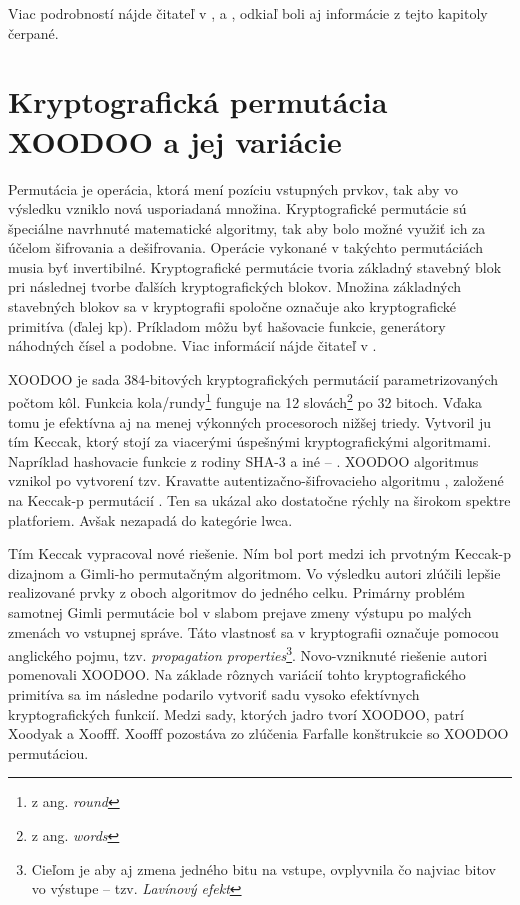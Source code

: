 Viac podrobností nájde čitateľ v \cite{lwc}, \cite{lwc2} a \cite{lwc3}, odkiaľ boli aj informácie z tejto kapitoly čerpané. 
        
\section{Kryptografická permutácia XOODOO a jej variácie}
Permutácia je operácia, ktorá mení pozíciu vstupných prvkov, tak aby vo výsledku vzniklo nová usporiadaná množina. Kryptografické permutácie sú špeciálne navrhnuté matematické algoritmy, tak aby bolo možné využiť ich za účelom šifrovania a dešifrovania. Operácie vykonané v takýchto permutáciách musia byť invertibilné. Kryptografické permutácie tvoria základný stavebný blok pri následnej tvorbe ďalších kryptografických blokov. Množina základných stavebných blokov sa v kryptografii spoločne označuje ako kryptografické primitíva (ďalej \acrshort{kp}). Príkladom môžu byť hašovacie funkcie, generátory náhodných čísel a podobne. Viac informácií nájde čitateľ v \cite{kp}.  
 
XOODOO je sada 384-bitových kryptografických permutácií parametrizovaných počtom kôl. Funkcia kola/rundy\footnote{z ang. \textit{round}} funguje na 12 slovách\footnote{z ang. \textit{words}} po 32 bitoch. Vďaka tomu je efektívna aj na menej výkonných procesoroch nižšej triedy. Vytvoril ju tím Keccak, ktorý stojí za viacerými úspešnými kryptografickými algoritmami. Napríklad hashovacie funkcie z rodiny SHA-3 a iné -- \cite{kecsup}. XOODOO algoritmus vznikol po vytvorení tzv. Kravatte autentizačno-šifrovacieho algoritmu \cite{kravatte}, založené na Keccak-p permutácií \cite{keccakp}. Ten sa ukázal ako dostatočne rýchly na širokom spektre platforiem. Avšak nezapadá do kategórie \acrshort{lwca}.

Tím Keccak vypracoval nové riešenie. Ním bol port medzi ich prvotným Keccak-p dizajnom a Gimli-ho \cite{bernstein2017gimli} permutačným algoritmom. Vo výsledku autori zlúčili lepšie realizované prvky z oboch algoritmov do jedného celku. Primárny problém samotnej Gimli permutácie bol v slabom prejave zmeny výstupu po malých zmenách vo vstupnej správe. Táto vlastnosť sa v kryptografii označuje pomocou anglického pojmu, tzv. \textit{propagation properties}\footnote{Cieľom je aby aj zmena jedného bitu na vstupe, ovplyvnila čo najviac bitov vo výstupe -- tzv. \textit{Lavínový efekt}}. Novo-vzniknuté riešenie autori pomenovali XOODOO. Na základe rôznych variácií tohto kryptografického primitíva sa im následne podarilo vytvoriť sadu vysoko efektívnych kryptografických funkcií. 
Medzi sady, ktorých jadro tvorí XOODOO, patrí Xoodyak a Xoofff. Xoofff pozostáva zo zlúčenia Farfalle konštrukcie \cite{farfalle} so XOODOO permutáciou. 


